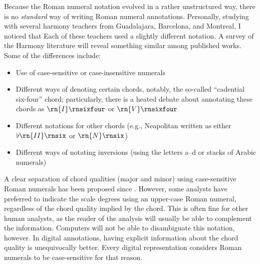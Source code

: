 Because the Roman numeral notation evolved in a rather
unstructured way, there is no \emph{standard} way of writing
Roman numeral annotations.
Personally, studying with several harmony teachers from
Guadalajara, Barcelona, and Montreal, I noticed that Each of
these teachers used a slightly different notation. A survey
of the Harmony literature will reveal something similar
among published works. Some of the differences include:
\begin{itemize}
    \item Use of case-sensitive or case-insensitive numerals
    \item Different ways of denoting certain chords,
    notably, the so-called ``cadential six-four'' chord;
    particularly, there is a heated debate about annotating
    these chords as $\rn{I}\rnsixfour$ or $\rn{V}\rnsixfour$
    \item Different notations for other chords (e.g.,
    Neapolitan written as either $\flat\rn{II}\rnsix$ or
    $\rn{N}\rnsix$)
    \item Different ways of notating inversions (using the
    letters a--d or stacks of Arabic numerals)
\end{itemize}

A clear separation of chord qualities (major and minor)
using case-sensitive Roman numerals has been proposed since
\textcite{weber1817versuch}. However, some analysts have
preferred to indicate the scale degrees using an upper-case
Roman numeral, regardless of the chord quality implied by
the chord. This is often fine for other human analysts, as
the reader of the analysis will usually be able to
complement the information. Computers will not be able to
disambiguate this notation, however. In digital annotations,
having explicit information about the chord quality is
unequivocally better. Every digital representation considers
Roman numerals to be case-sensitive for that reason.


